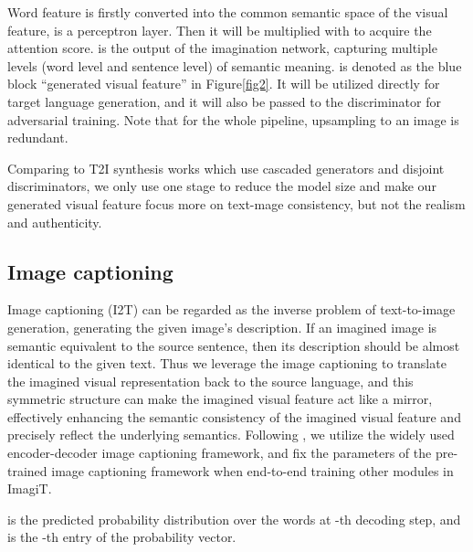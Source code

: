 \documentclass[11pt]{article}
\newcommand{\method}{ImagiT\xspace}
\begin{document}
\begin{small}

\end{small}


Word feature  is firstly converted into the common semantic space of the visual feature,  is a perceptron layer. Then it will be multiplied with  to acquire the attention score.  is the output of the imagination network, capturing multiple levels (word level and sentence level) of semantic meaning.  is denoted as the blue block ``generated visual feature'' in Figure\ref{fig2}. It will be utilized directly for target language generation, and it will also be passed to the discriminator for adversarial training. Note that for the whole pipeline, upsampling  to an image is redundant.

Comparing to T2I synthesis works which use cascaded generators and disjoint discriminators\cite{zhang2017stackgan, xu2018attngan, qiao2019mirrorgan}, we only use one stage to reduce the model size and make our generated visual feature  focus more on text-mage consistency, but not the realism and authenticity.

\subsection{Image captioning}

Image captioning (I2T) can be regarded as the inverse problem of text-to-image generation, generating the given image's description. If an imagined image is semantic equivalent to the source sentence, then its description should be almost identical to the given text. Thus we leverage the image captioning to translate the imagined visual representation back to the source language\cite{qiao2019mirrorgan}, and this symmetric structure can make the imagined visual feature act like a mirror, effectively enhancing the semantic consistency of the imagined visual feature and precisely reflect the underlying semantics. Following \citet{qiao2019mirrorgan}, we utilize the widely used encoder-decoder image captioning framework\cite{vinyals2015show}, and fix the parameters of the pre-trained image captioning framework when end-to-end training other modules in \method.





 is the predicted probability distribution over the words at -th decoding step, and  is the -th entry of the probability vector.
\end{document}
